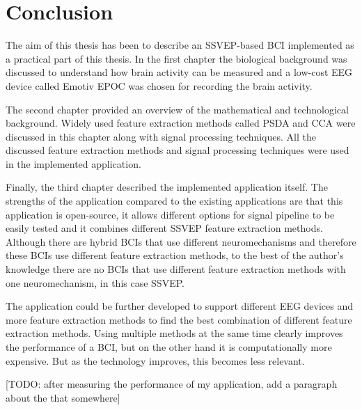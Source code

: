 
\chapter*{Conclusion}

The aim of this thesis has been to describe an \gls{SSVEP}-based \gls{BCI} implemented as a practical part of this thesis. In the first chapter the biological background was discussed to understand how brain activity can be measured and a low-cost \gls{EEG} device called Emotiv EPOC was chosen for recording the brain activity.

The second chapter provided an overview of the mathematical and technological background. Widely used \gls{feature extraction} methods called \gls{PSDA} and \gls{CCA} were discussed in this chapter along with signal processing techniques. All the discussed \gls{feature extraction} methods and signal processing techniques were used in the implemented application.

Finally, the third chapter described the implemented application itself. The strengths of the application compared to the existing applications are that this application is open-source, it allows different options for signal pipeline to be easily tested and it combines different \gls{SSVEP} \gls{feature extraction} methods. Although there are hybrid \glspl{BCI} that use different neuromechanisms and therefore these \glspl{BCI} use different \gls{feature extraction} methods, to the best of the author's knowledge there are no \glspl{BCI} that use different \gls{feature extraction} methods with one neuromechanism, in this case \gls{SSVEP}.

The application could be further developed to support different \gls{EEG} devices and more \gls{feature extraction} methods to find the best combination of different \gls{feature extraction} methods. Using multiple methods at the same time clearly improves the performance of a \gls{BCI}, but on the other hand it is computationally more expensive. But as the technology improves, this becomes less relevant.

[TODO: after measuring the performance of my application, add a paragraph about the that somewhere]
